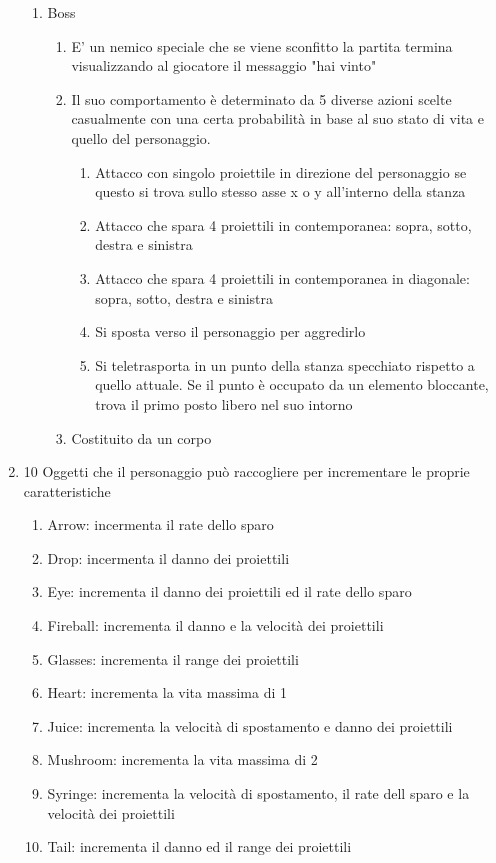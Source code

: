 \begin{enumerate}
\begin{enumerate}
        \item Boss
        \begin{enumerate}
            \item E' un nemico speciale che se viene sconfitto la partita termina visualizzando al giocatore il messaggio "hai vinto"
            \item Il suo comportamento è determinato da 5 diverse azioni scelte casualmente con una certa probabilità in base al suo stato di vita e quello del personaggio.
            \begin{enumerate}
				\item Attacco con singolo proiettile in direzione del personaggio se questo si trova sullo stesso asse x o y all'interno della stanza
				\item Attacco che spara 4 proiettili in contemporanea: sopra, sotto, destra e sinistra
				\item Attacco che spara 4 proiettili in contemporanea in diagonale: sopra, sotto, destra e sinistra
				\item Si sposta verso il personaggio per aggredirlo
				\item Si teletrasporta in un punto della stanza specchiato rispetto a quello attuale. Se il punto è occupato da un elemento bloccante, trova il primo posto libero nel suo intorno
			\end{enumerate}
            \item Costituito da un corpo
        \end{enumerate}
    \end{enumerate}
    
    \item 10 Oggetti che il personaggio può raccogliere per incrementare le proprie caratteristiche
    \begin{enumerate}
        \item Arrow: incermenta il rate dello sparo 
        \item Drop: incermenta il danno dei proiettili
        \item Eye: incrementa il danno dei proiettili ed il rate dello sparo
        \item Fireball: incrementa il danno e la velocità dei proiettili
        \item Glasses: incrementa il range dei proiettili
        \item Heart: incrementa la vita massima di 1
        \item Juice: incrementa la velocità di spostamento e danno dei proiettili
        \item Mushroom: incrementa la vita massima di 2
		\item Syringe: incrementa la velocità di spostamento, il rate dell sparo e la velocità dei proiettili
		\item Tail: incrementa il danno ed il range dei proiettili
    \end{enumerate}
         
\end{enumerate}


